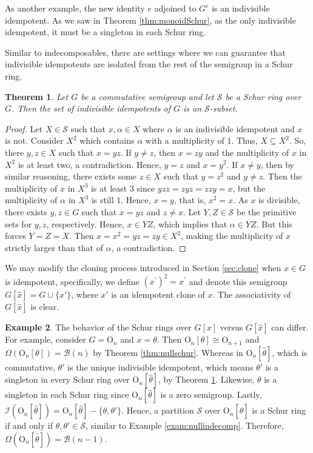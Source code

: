 \documentclass{article}
\theoremstyle{plain}
\newtheorem{Thm}{Theorem}[section]
\theoremstyle{definition}
\newtheorem{Exam}[Thm]{Example}
\newcommand{\thmref}[1]{Theorem \ref{#1}}
\renewcommand{\S}{\mathcal{S}}
\newcommand{\I}{\mathscr{I}}
\newcommand{\B}{\mathscr{B}}
\renewcommand{\O}{\mathrm{O}}
\begin{document}
As another example, the new identity $e$ adjoined to $G^e$ is an indivisible idempotent. As we saw in \thmref{thm:monoidSchur}, as the only indivisible idempotent, it must be a singleton in each Schur ring.

Similar to indecomposables, there are settings where we can guarantee that indivisible idempotents are isolated from the rest of the semigroup in a Schur ring.

\begin{Thm}\label{thm:indivisibleidempotent} Let $G$ be a commutative semigroup and let $\S$ be a Schur ring over $G$. Then the set of indivisible idempotents of $G$ is an $\S$-subset.
\end{Thm}
\begin{proof}
    Let $X\in \S$ such that $x,\alpha\in X$ where $\alpha$ is an indivisible idempotent and $x$ is not. Consider $X^2$ which contains $\alpha$ with a multiplicity of $1$. Thus, $X\subseteq X^2$. So, there $y,z\in X$ such that $x=yz$. If $y\neq z$, then $x=zy$ and the multiplicity of $x$ in $X^2$ is at least two, a contradiction. Hence, $y=z$ and $x=y^2$.
    If $x\neq y$, then by similar reasoning, there exists some $z\in X$ such that $y=z^2$ and $y\neq z$. Then the multiplicity of $x$ in $X^3$ is at least $3$ since $yzz=zyz=zzy= x$, but the multiplicity of $\alpha$ in $X^3$ is still $1$. Hence, $x=y$, that is, $x^2=x$. As $x$ is divisible, there exists $y,z\in G$ such that $x=yz$ and $z\neq x$. Let $Y,Z\in \S$ be the primitive sets for $y,z$, respectively. Hence, $x\in YZ$, which implies that $\alpha\in YZ$. But this forces $Y=Z=X$. Then $x=x^2=yz=zy\in X^2$, making the multiplicity of $x$ strictly larger than that of $\alpha$, a contradiction.
\end{proof}

We may modify the cloning process introduced in Section \ref{sec:clone} when $x\in G$ is idempotent, specifically, we define $(x^\prime)^2=x^\prime$ and denote this semigroup \label{Iclone}$G[\hat{x}] = G\cup \{x'\}$, where $x'$ is an idempotent clone of $x$. The associativity of $G[\hat{x}]$ is clear.

\begin{Exam} The behavior of the Schur rings over $G[x]$ versus $G[\hat{x}]$ can differ. For example, consider $G=\O_n$ and $x=\theta$. Then $\O_n[\theta]\cong \O_{n+1}$ and $\Omega(\O_n[\theta]) = \B(n)$ by Theorem \ref{thm:nullschur}. Whereas in $\O_n[\hat{\theta}]$, which is commutative, $\theta'$ is the unique indivisible idempotent, which means $\theta'$ is a singleton in every Schur ring over $\O_n[\hat{\theta}]$, by Theorem \ref{thm:indivisibleidempotent}. Likewise, $\theta$ is a singleton in each Schur ring since $\O_n[\hat{\theta}]$ is a zero semigroup. Lastly, $\I(\O_n[\hat{\theta}]) = \O_n[\hat{\theta}] - \{\theta,\theta'\}$. Hence, a partition $\S$ over $\O_n[\hat{\theta}]$ is a Schur ring if and only if $\theta, \theta'\in \S$, similar to Example \ref{exam:nullindecomp}. Therefore, $\Omega(\O_n[\hat{\theta}]) = \B(n-1)$.
\end{Exam}
\end{document}
